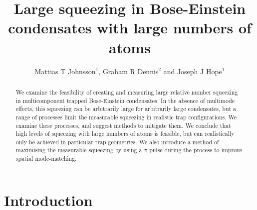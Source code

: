 \documentclass{iopart}
\begin{document}
\title{Large squeezing in Bose-Einstein condensates with large numbers of atoms}

\author{Mattias T Johnsson$^1$, Graham R Dennis$^2$ and Joseph J Hope$^1$}

\address{$^1$Department of Quantum Science, Research School of Physics and Engineering, The Australian National University, Canberra ACT 0200, Australia}
\address{$^2$Plasma Research Laboratory, Research School of Physics and Engineering, The Australian National University, Canberra ACT 0200, Australia}

\begin{abstract}
We examine the feasibility of creating and measuring large relative number squeezing in multicomponent trapped Bose-Einstein condensates.  In the absence of multimode effects, this squeezing can be arbitrarily large for arbitrarily large condensates, but a range of processes limit the measurable squeezing in realistic trap configurations.  We examine these processes, and suggest methods to mitigate them. We conclude that high levels of squeezing with large numbers of atoms is feasible, but can realistically only be achieved in particular trap geometries.  We also introduce a method of maximising the measurable squeezing by using a $\pi$-pulse during the process to improve spatial mode-matching.
\end{abstract}

\maketitle

\section{Introduction}
\label{sectionIntroduction}
\end{document}
